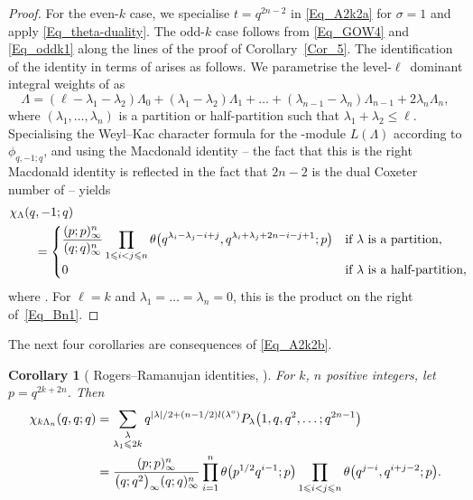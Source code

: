 \documentclass[pdftex]{sigma}
\numberwithin{equation}{section}
\newtheorem{Corollary}[Theorem]{Corollary}
\renewcommand{\leq}{\leqslant}
\newcommand{\abs}[1]{\vert#1\vert}
\newcommand{\la}{\lambda}
\newcommand{\La}{\Lambda}
\begin{document}
\begin{proof}
For the even-$k$ case, we specialise $t=q^{2n-2}$ in
\eqref{Eq_A2k2a} for $\sigma=1$ and apply \eqref{Eq_theta-duality}.
The odd-$k$ case follows from \eqref{Eq_GOW4} and \eqref{Eq_oddk1}
along the lines of the proof of Corollary~\ref{Cor_5}.
The identification of the identity in terms of 
arises as follows.
We parametrise the \mbox{level-$\ell$}~dominant integral weights of
 as
\[
\La=(\ell-\la_1-\la_2)\La_0+(\la_1-\la_2)\La_1+\dots+
(\la_{n-1}-\la_n)\La_{n-1}+2\la_n\La_n,
\]
where $(\la_1,\dots,\la_n)$ is a partition or half-partition
such that $\la_1+\la_2\leq\ell$.
Specialising the Weyl--Kac character formula
\cite[equation~(10.4.1)]{Kac90} for the -module
$L(\La)$ according to $\phi_{q,-1;q}$, and using the 
Macdonald identity -- the fact that this is the right Macdonald identity
is reflected in the fact that $2n-2$ is the dual Coxeter number of
 -- yields
\begin{align}
&\chi_{\La}(q,-1;q) \notag \\
&\qquad = \begin{cases}\displaystyle
\frac{(p;p)_{\infty}^n}{(q;q)_{\infty}^n}
\prod_{1\leq i<j\leq n}
\theta\bigl(q^{\la_i-\la_j-i+j},q^{\la_i+\la_j+2n-i-j+1};p\bigr)
&\text{if $\la$ is a partition}, \\[3mm]
0 &\text{if $\la$ is a half-partition},
\end{cases}\!\!\! \label{Eq_Bn-specialisation}
\end{align}
where .
For $\ell=k$ and $\la_1=\dots=\la_n=0$, this is the product on the right
of~\eqref{Eq_Bn1}.
\end{proof}

The next four corollaries are consequences of \eqref{Eq_A2k2b}.

\begin{Corollary}[ Rogers--Ramanujan identities,
{\cite[Theorem 5.17]{RW21}}]\label{Cor_8}
For $k$, $n$ positive integers, let $p=q^{2k+2n}$.
Then
\begin{align*}
\chi_{k\La_n}(q,q;q)&=\sum_{\substack{\la \\[1pt] \la_1\leq 2k}}
q^{\abs{\la}/2+(n-1/2)l(\la^{\textup{o}})}
P_{\la}\bigl(1,q,q^2,\dots;q^{2n-1}\bigr) \\
&=\frac{(p;p)_{\infty}^n}{\bigl(q;q^2\bigr)_{\infty}(q;q)_{\infty}^n}
\prod_{i=1}^n \theta\bigl(p^{1/2}q^{i-1};p\bigr)
\prod_{1\leq i<j\leq n} \theta\bigl(q^{j-i},q^{i+j-2};p\bigr).
\end{align*}
\end{Corollary}
\end{document}
